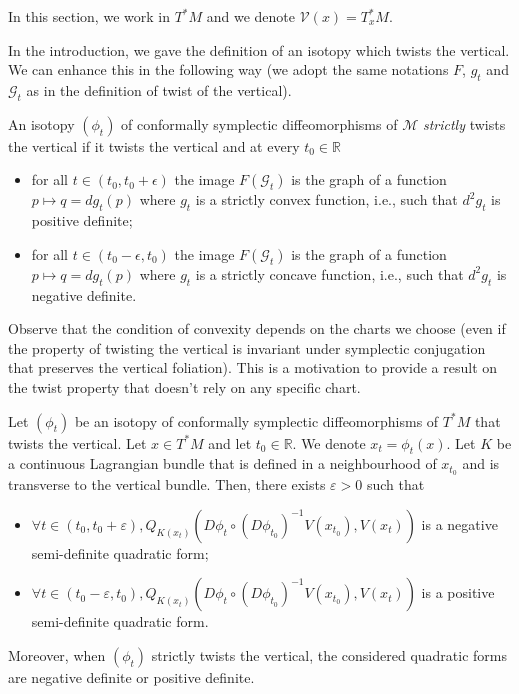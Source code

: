 \documentclass[AHL, Unicode, longabstracts, published]{cedram}
\newcommand*\M{\mathcal{M}}
\newcommand*\cg{\mathcal{G}}
\newcommand*\cal{\mathcal}
\newcommand*\R{\mathbb{R}}
\let\oldforall\forall
\renewcommand*{\forall}{\mathrel{\oldforall}}
\begin{document}
In this section, we work in $T^*M$ and we denote ${\cal V}(x)=T_x^*M$.

In the introduction, we gave the definition of an isotopy which twists the vertical. We can enhance this in the following way (we adopt the same notations $F$, $g_t$ and $\cg_t$ as in the definition of twist of the vertical).

\begin{defi}
An isotopy $(\phi_t)$ of conformally symplectic diffeomorphisms of $\M$ \emph{strictly} twists the vertical if it twists the vertical and at every $t_0\in\R$
\begin{itemize}
\item for all $t\in(t_0,t_0+\epsilon)$ the image $F(\cg_t)$ is the graph of a function $p\mapsto q=dg_t(p)$ where $g_t$ is a strictly convex function, i.e., such that $d^2g_t$ is positive definite;
\item for all $t\in(t_0-\epsilon,t_0)$ the image $F(\cg_t)$ is the graph of a function $p\mapsto q=dg_t(p)$ where $g_t$ is a strictly concave function, i.e., such that $d^2g_t$ is negative definite.
\end{itemize}
\end{defi}




Observe that the condition of convexity depends on the charts we choose (even if the property of twisting the vertical is invariant under symplectic conjugation that preserves the vertical foliation). This is a motivation to provide a result on the twist property that doesn't rely on any specific chart.

\begin{prop}\label{Ptwistintrinsec}
Let $(\phi_t)$ be an isotopy of conformally symplectic diffeomorphisms of $T^*M$ that twists the vertical. Let $x\in T^*M$ and let $t_0\in\R$. We denote $x_t=\phi_t(x)$. Let $K$ be a continuous Lagrangian bundle that is defined in a neighbourhood of $x_{t_0}$ and is transverse to the vertical bundle. Then, there exists $\varepsilon>0$ such that
\begin{itemize}
\item $\forall t\in (t_0, t_0+\varepsilon), Q_{K(x_t)}(D\phi_t\circ (D\phi_{t_0})^{-1}V(x_{t_0}), V(x_t)) $ is a negative semi-definite quadratic form;
\item $\forall t\in (t_0-\varepsilon, t_0), Q_{K(x_t)}(D\phi_t\circ (D\phi_{t_0})^{-1}V(x_{t_0}), V(x_t)) $ is a positive semi-definite quadratic form.
\end{itemize}
Moreover, when $(\phi_t)$ strictly twists the vertical, the considered quadratic forms are negative definite or positive definite.
\end{prop}
\end{document}
